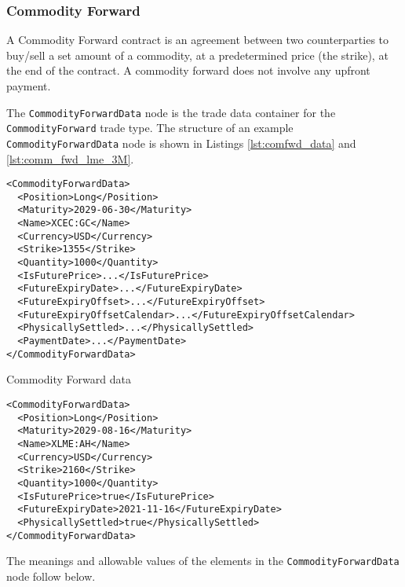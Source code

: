 \subsubsection{Commodity Forward}

A Commodity Forward contract is an agreement between two counterparties to buy/sell
a set amount of a commodity, at a predetermined price (the strike), at the end of 
the contract. A commodity forward does not involve any upfront payment.

The \lstinline!CommodityForwardData! node is the trade data container for the \lstinline!CommodityForward! trade type. The structure of an example \lstinline!CommodityForwardData! node is shown in Listings \ref{lst:comfwd_data} and \ref{lst:comm_fwd_lme_3M}.

\begin{listing}[H]
\begin{verbatim}
<CommodityForwardData>
  <Position>Long</Position>
  <Maturity>2029-06-30</Maturity>
  <Name>XCEC:GC</Name>
  <Currency>USD</Currency>
  <Strike>1355</Strike>
  <Quantity>1000</Quantity>
  <IsFuturePrice>...</IsFuturePrice>
  <FutureExpiryDate>...</FutureExpiryDate>
  <FutureExpiryOffset>...</FutureExpiryOffset>
  <FutureExpiryOffsetCalendar>...</FutureExpiryOffsetCalendar>
  <PhysicallySettled>...</PhysicallySettled>
  <PaymentDate>...</PaymentDate>
</CommodityForwardData>
\end{verbatim}
\caption{Commodity Forward data}
\label{lst:comfwd_data}
\end{listing}

\begin{listing}[H]
\begin{verbatim}
<CommodityForwardData>
  <Position>Long</Position>
  <Maturity>2029-08-16</Maturity>
  <Name>XLME:AH</Name>
  <Currency>USD</Currency>
  <Strike>2160</Strike>
  <Quantity>1000</Quantity>
  <IsFuturePrice>true</IsFuturePrice>
  <FutureExpiryDate>2021-11-16</FutureExpiryDate>
  <PhysicallySettled>true</PhysicallySettled>
</CommodityForwardData>
\end{verbatim}
\caption{\lstinline!CommodityForwardData! for forward on LME Aluminium 3M future.}
\label{lst:comm_fwd_lme_3M}
\end{listing}

The meanings and allowable values of the elements in the \lstinline!CommodityForwardData! node follow below.


